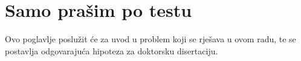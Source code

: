 \documentclass[a4paper,12pt]{report}
\begin{document}
\section{Samo prašim po testu}
Ovo poglavlje poslu\v{z}it \'{c}e za uvod u problem koji se rje\v{s}ava u ovom
radu, te se postavlja odgovaraju\'{c}a hipoteza za doktorsku
disertaciju.


%

\newpage
\ifpdf
\fi

\end{document}
